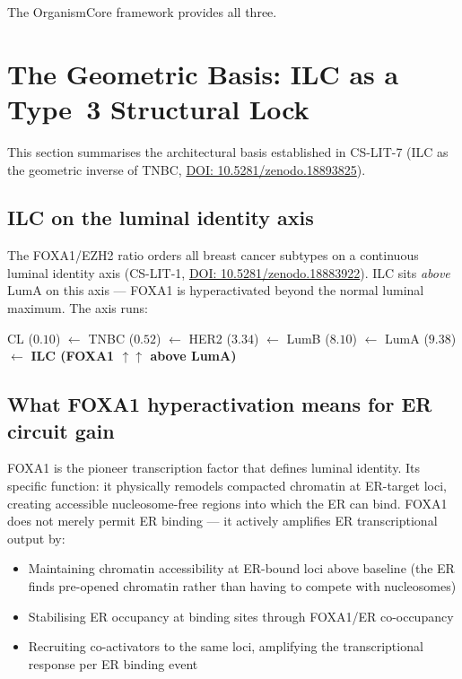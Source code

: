 \documentclass[12pt, a4paper]{article}
\begin{document}
The OrganismCore framework provides all three.

\section{The Geometric Basis: ILC as a Type~3
Structural Lock}

This section summarises the architectural basis
established in CS-LIT-7 (ILC as the geometric
inverse of TNBC,
\href{https://doi.org/10.5281/zenodo.18893825}
{DOI: 10.5281/zenodo.18893825}).

\subsection{ILC on the luminal identity axis}

The FOXA1/EZH2 ratio orders all breast cancer
subtypes on a continuous luminal identity axis
(CS-LIT-1,
\href{https://doi.org/10.5281/zenodo.18883922}
{DOI: 10.5281/zenodo.18883922}). ILC sits
\textit{above} LumA on this axis --- FOXA1 is
hyperactivated beyond the normal luminal maximum.
The axis runs:

\begin{center}
\small
CL ($0.10$) $\leftarrow$
TNBC ($0.52$) $\leftarrow$
HER2 ($3.34$) $\leftarrow$
LumB ($8.10$) $\leftarrow$
LumA ($9.38$) $\leftarrow$
\textbf{ILC (FOXA1 $\uparrow\uparrow$ above LumA)}
\end{center}

\subsection{What FOXA1 hyperactivation means
for ER circuit gain}

FOXA1 is the pioneer transcription factor that
defines luminal identity. Its specific function:
it physically remodels compacted chromatin at
ER-target loci, creating accessible nucleosome-free
regions into which the ER can bind. FOXA1 does not
merely permit ER binding --- it actively amplifies
ER transcriptional output by:

\begin{itemize}
    \item Maintaining chromatin accessibility at
    ER-bound loci above baseline (the ER finds
    pre-opened chromatin rather than having to
    compete with nucleosomes)
    \item Stabilising ER occupancy at binding
    sites through FOXA1/ER co-occupancy
    \item Recruiting co-activators to the same
    loci, amplifying the transcriptional response
    per ER binding event
\end{itemize}
\end{document}

